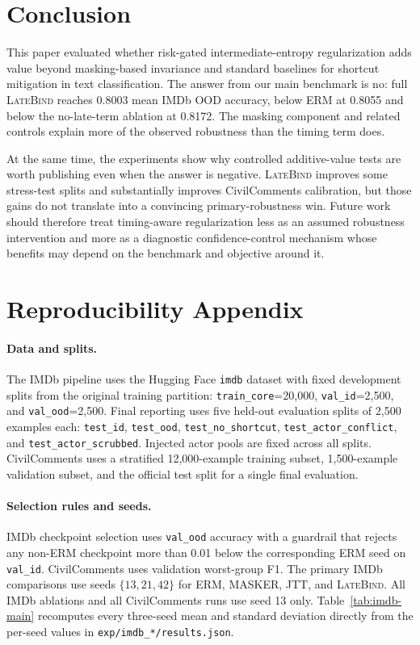 \documentclass{article}
\newcommand{\LateBind}{\textsc{LateBind}}
\begin{document}
\section{Conclusion}

This paper evaluated whether risk-gated intermediate-entropy regularization adds value beyond masking-based invariance and standard baselines for shortcut mitigation in text classification. The answer from our main benchmark is no: full \LateBind{} reaches 0.8003 mean IMDb OOD accuracy, below ERM at 0.8055 and below the no-late-term ablation at 0.8172. The masking component and related controls explain more of the observed robustness than the timing term does.

At the same time, the experiments show why controlled additive-value tests are worth publishing even when the answer is negative. \LateBind{} improves some stress-test splits and substantially improves CivilComments calibration, but those gains do not translate into a convincing primary-robustness win. Future work should therefore treat timing-aware regularization less as an assumed robustness intervention and more as a diagnostic confidence-control mechanism whose benefits may depend on the benchmark and objective around it.

\appendix
\section{Reproducibility Appendix}

\paragraph{Data and splits.}
The IMDb pipeline uses the Hugging Face \texttt{imdb} dataset with fixed development splits from the original training partition: \texttt{train\_core}=20{,}000, \texttt{val\_id}=2{,}500, and \texttt{val\_ood}=2{,}500. Final reporting uses five held-out evaluation splits of 2{,}500 examples each: \texttt{test\_id}, \texttt{test\_ood}, \texttt{test\_no\_shortcut}, \texttt{test\_actor\_conflict}, and \texttt{test\_actor\_scrubbed}. Injected actor pools are fixed across all splits. CivilComments uses a stratified 12{,}000-example training subset, 1{,}500-example validation subset, and the official test split for a single final evaluation.

\paragraph{Selection rules and seeds.}
IMDb checkpoint selection uses \texttt{val\_ood} accuracy with a guardrail that rejects any non-ERM checkpoint more than 0.01 below the corresponding ERM seed on \texttt{val\_id}. CivilComments uses validation worst-group F1. The primary IMDb comparisons use seeds $\{13,21,42\}$ for ERM, MASKER, JTT, and \LateBind. All IMDb ablations and all CivilComments runs use seed 13 only. Table~\ref{tab:imdb-main} recomputes every three-seed mean and standard deviation directly from the per-seed values in \texttt{exp/imdb\_*/results.json}.
\end{document}
